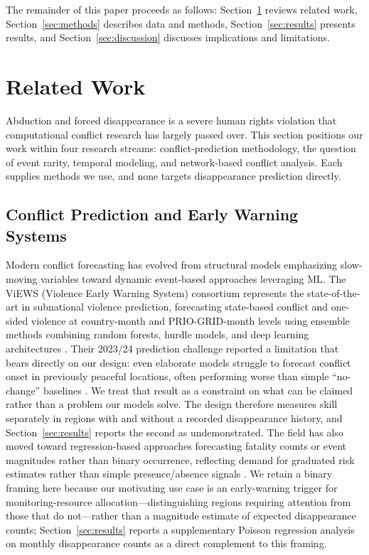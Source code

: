 \documentclass[pdflatex,sn-mathphys-num]{sn-jnl}%
\theoremstyle{thmstyleone}%
\theoremstyle{thmstyletwo}%
\theoremstyle{thmstylethree}%
\begin{document}
The remainder of this paper proceeds as follows: Section~\ref{sec:related} reviews related work, Section~\ref{sec:methods} describes data and methods, Section~\ref{sec:results} presents results, and Section~\ref{sec:discussion} discusses implications and limitations.

\section{Related Work}\label{sec:related}

Abduction and forced disappearance is a severe human rights violation that computational conflict research has largely passed over. This section positions our work within four research streams: conflict-prediction methodology, the question of event rarity, temporal modeling, and network-based conflict analysis. Each supplies methods we use, and none targets disappearance prediction directly.

\subsection{Conflict Prediction and Early Warning Systems}

Modern conflict forecasting has evolved from structural models emphasizing slow-moving variables toward dynamic event-based approaches leveraging ML. The ViEWS (Violence Early Warning System) consortium represents the state-of-the-art in subnational violence prediction, forecasting state-based conflict and one-sided violence at country-month and PRIO-GRID-month levels using ensemble methods combining random forests, hurdle models, and deep learning architectures \cite{hegre2019views, hegre2021views}. Their 2023/24 prediction challenge reported a limitation that bears directly on our design: even elaborate models struggle to forecast conflict onset in previously peaceful locations, often performing worse than simple ``no-change'' baselines \cite{hegre2024views}. We treat that result as a constraint on what can be claimed rather than a problem our models solve. The design therefore measures skill separately in regions with and without a recorded disappearance history, and Section~\ref{sec:results} reports the second as undemonstrated. The field has also moved toward regression-based approaches forecasting fatality counts or event magnitudes rather than binary occurrence, reflecting demand for graduated risk estimates rather than simple presence/absence signals \cite{hegre2024views}. We retain a binary framing here because our motivating use case is an early-warning trigger for monitoring-resource allocation---distinguishing regions requiring attention from those that do not---rather than a magnitude estimate of expected disappearance counts; Section~\ref{sec:results} reports a supplementary Poisson regression analysis on monthly disappearance counts as a direct complement to this framing.
\end{document}
